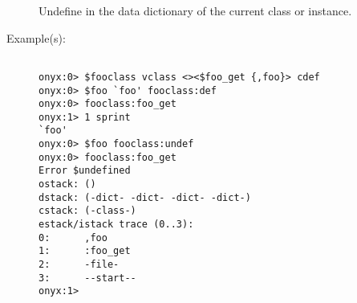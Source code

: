 \begin{description}
\begin{description}
		Undefine  in the data dictionary of the current class
		or instance.
	\item[Example(s): ]\begin{verbatim}

onyx:0> $fooclass vclass <><$foo_get {,foo}> cdef
onyx:0> $foo `foo' fooclass:def
onyx:0> fooclass:foo_get
onyx:1> 1 sprint
`foo'
onyx:0> $foo fooclass:undef
onyx:0> fooclass:foo_get
Error $undefined
ostack: ()
dstack: (-dict- -dict- -dict- -dict-)
cstack: (-class-)
estack/istack trace (0..3):
0:      ,foo
1:      :foo_get
2:      -file-
3:      --start--
onyx:1>
		\end{verbatim}
	\end{description}
\end{description}
